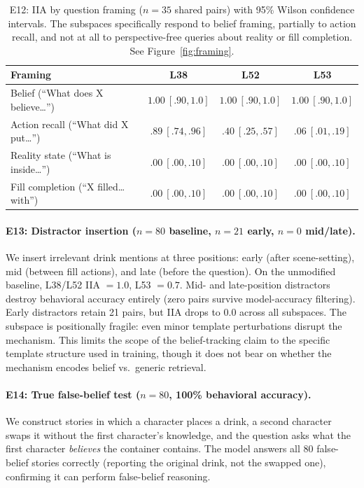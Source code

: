 \documentclass[11pt]{article}
\begin{document}
\begin{table}[t]
\centering
\caption{E12: IIA by question framing ($n = 35$ shared pairs) with 95\% Wilson confidence intervals. The subspaces specifically respond to belief framing, partially to action recall, and not at all to perspective-free queries about reality or fill completion. See Figure~\ref{fig:framing}.}
\label{tab:framing}
\begin{tabular}{lccc}
\toprule
\textbf{Framing} & \textbf{L38} & \textbf{L52} & \textbf{L53} \\
\midrule
Belief (``What does X believe\ldots'') & $1.00\ [.90, 1.0]$ & $1.00\ [.90, 1.0]$ & $1.00\ [.90, 1.0]$ \\
Action recall (``What did X put\ldots'') & $.89\ [.74, .96]$ & $.40\ [.25, .57]$ & $.06\ [.01, .19]$ \\
Reality state (``What is inside\ldots'') & $.00\ [.00, .10]$ & $.00\ [.00, .10]$ & $.00\ [.00, .10]$ \\
Fill completion (``X filled\ldots with'') & $.00\ [.00, .10]$ & $.00\ [.00, .10]$ & $.00\ [.00, .10]$ \\
\bottomrule
\end{tabular}
\end{table}

\paragraph{E13: Distractor insertion ($n = 80$ baseline, $n = 21$ early, $n = 0$ mid/late).}
We insert irrelevant drink mentions at three positions: early (after scene-setting), mid (between fill actions), and late (before the question). On the unmodified baseline, L38/L52 IIA $= 1.0$, L53 $= 0.7$. Mid- and late-position distractors destroy behavioral accuracy entirely (zero pairs survive model-accuracy filtering). Early distractors retain 21 pairs, but IIA drops to $0.0$ across all subspaces. The subspace is positionally fragile: even minor template perturbations disrupt the mechanism. This limits the scope of the belief-tracking claim to the specific template structure used in training, though it does not bear on whether the mechanism encodes belief vs.\ generic retrieval.

\paragraph{E14: True false-belief test ($n = 80$, 100\% behavioral accuracy).}
We construct stories in which a character places a drink, a second character swaps it without the first character's knowledge, and the question asks what the first character \emph{believes} the container contains. The model answers all 80 false-belief stories correctly (reporting the original drink, not the swapped one), confirming it can perform false-belief reasoning.
\end{document}
